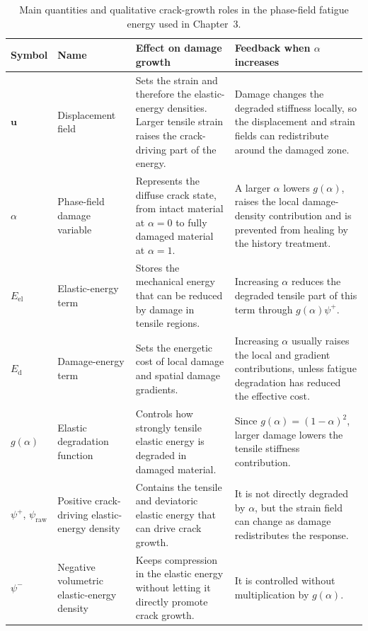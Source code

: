 \clearpage
\begingroup
    \footnotesize
    \renewcommand{\arraystretch}{1.12}
    \begin{longtable}{@{}>{\raggedright\arraybackslash}p{}
    >{\raggedright\arraybackslash}p{}
    >{\raggedright\arraybackslash}p{}
    >{\raggedright\arraybackslash}p{}@{}}
        \caption{Main quantities and qualitative crack-growth roles in the phase-field fatigue energy used in Chapter~3.}
        \label{tab:c3_phase_field_energy_quantities}\\
        \toprule
        Symbol & Name & Effect on damage growth & Feedback when $\alpha$ increases \\
        \midrule
        $\mathbf{u}$ & Displacement field & Sets the strain and therefore the elastic-energy densities. Larger tensile strain raises the crack-driving part of the energy. & Damage changes the degraded stiffness locally, so the displacement and strain fields can redistribute around the damaged zone. \\
        $\alpha$ & Phase-field damage variable & Represents the diffuse crack state, from intact material at $\alpha=0$ to fully damaged material at $\alpha=1$. & A larger $\alpha$ lowers $g(\alpha)$, raises the local damage-density contribution and is prevented from healing by the history treatment. \\
        $E_{\mathrm{el}}$ & Elastic-energy term & Stores the mechanical energy that can be reduced by damage in tensile regions. & Increasing $\alpha$ reduces the degraded tensile part of this term through $g(\alpha)\psi^+$. \\
        $E_{\mathrm{d}}$ & Damage-energy term & Sets the energetic cost of local damage and spatial damage gradients. & Increasing $\alpha$ usually raises the local and gradient contributions, unless fatigue degradation has reduced the effective cost. \\
        $g(\alpha)$ & Elastic degradation function & Controls how strongly tensile elastic energy is degraded in damaged material. & Since $g(\alpha)=(1-\alpha)^2$, larger damage lowers the tensile stiffness contribution. \\
        $\psi^+$, $\psi_{\mathrm{raw}}$ & Positive crack-driving elastic-energy density & Contains the tensile and deviatoric elastic energy that can drive crack growth. & It is not directly degraded by $\alpha$, but the strain field can change as damage redistributes the response. \\
        $\psi^-$ & Negative volumetric elastic-energy density & Keeps compression in the elastic energy without letting it directly promote crack growth. & It is controlled without multiplication by $g(\alpha)$. \\

\end{longtable}

